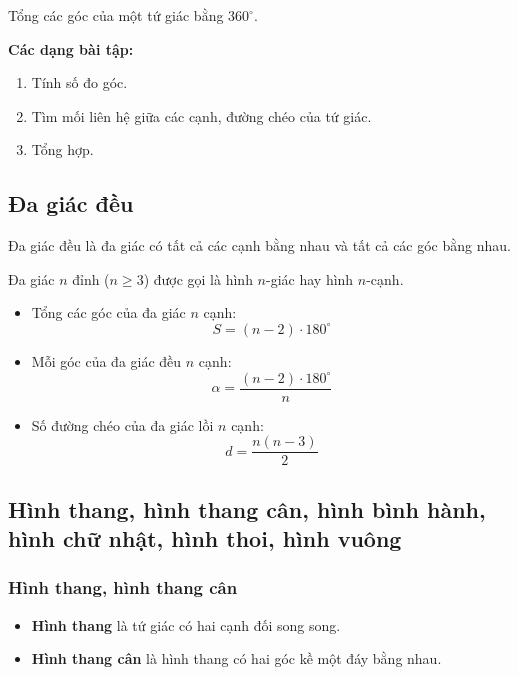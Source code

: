 \documentclass[12pt,a4paper]{article}
\begin{document}
\begin{tinhchat}
  Tổng các góc của một tứ giác bằng $360^\circ$.
\end{tinhchat}

\medskip\noindent\textbf{Các dạng bài tập:}
\begin{enumerate}[label=\textbf{Dạng \arabic*:}, leftmargin=*, align=left]
  \item Tính số đo góc.
  \item Tìm mối liên hệ giữa các cạnh, đường chéo của tứ giác.
  \item Tổng hợp.
\end{enumerate}

\subsection{Đa giác đều}

\begin{dinhnghia}
  Đa giác đều là đa giác có tất cả các cạnh bằng nhau và tất cả các góc bằng nhau.

  Đa giác $n$ đỉnh ($n \ge 3$) được gọi là hình $n$-giác hay hình $n$-cạnh.
\end{dinhnghia}

\begin{congthuc}[title={Công thức đa giác đều $n$ cạnh}]
  \begin{itemize}
    \item Tổng các góc của đa giác $n$ cạnh:
      \[ S = (n - 2) \cdot 180^\circ \]
    \item Mỗi góc của đa giác đều $n$ cạnh:
      \[ \alpha = \frac{(n - 2) \cdot 180^\circ}{n} \]
    \item Số đường chéo của đa giác lồi $n$ cạnh:
      \[ d = \frac{n(n - 3)}{2} \]
  \end{itemize}
\end{congthuc}

\subsection{Hình thang, hình thang cân, hình bình hành, hình chữ nhật, hình thoi, hình vuông}

\subsubsection{Hình thang, hình thang cân}

\begin{dinhnghia}
  \begin{itemize}
    \item \textbf{Hình thang} là tứ giác có hai cạnh đối song song.
    \item \textbf{Hình thang cân} là hình thang có hai góc kề một đáy bằng nhau.
  \end{itemize}
\end{dinhnghia}
\end{document}
